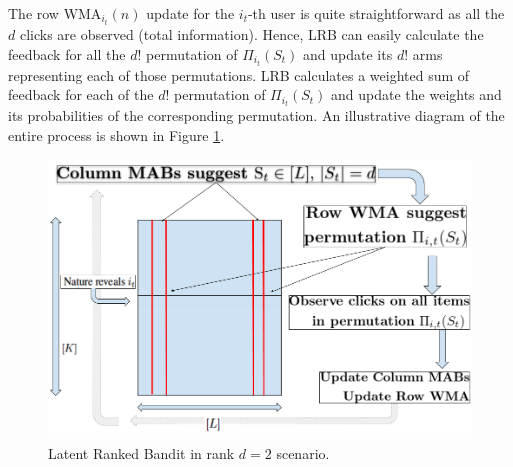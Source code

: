 The row WMA$_{i_t}(n)$ update for the $i_t$-th user is quite straightforward as all the $d$ clicks are observed (total information). Hence, LRB can easily calculate the feedback for all the $d!$ permutation of $\Pi_{i_t}(S_t)$ and update its $d!$ arms representing each of those permutations. LRB calculates a weighted sum of feedback for each of the $d!$ permutation of $\Pi_{i_t}(S_t)$ and update the weights and its probabilities of the corresponding permutation. An illustrative diagram of the entire process is shown in Figure \ref{fig:rankedbandit}.

\begin{figure}[!th]
    \includegraphics[scale=0.2]{img/RankedBand.png}
    \caption{Latent Ranked Bandit in rank $d=2$ scenario.}
    \label{fig:rankedbandit}
    \vspace*{-1em}
\end{figure}


